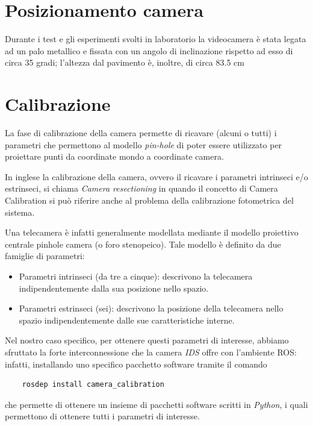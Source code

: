 \section{Posizionamento camera}

Durante i test e gli esperimenti svolti in laboratorio la videocamera è stata legata ad un palo metallico e fissata con un angolo di inclinazione rispetto ad esso di circa 35 gradi; l'altezza dal pavimento è, inoltre, di circa 83.5 cm

\section{Calibrazione}
La fase di calibrazione della camera permette di ricavare (alcuni o tutti) i parametri che permettono al modello \textit{pin-hole} di poter essere utilizzato per proiettare punti da coordinate mondo a coordinate camera. 

In inglese la calibrazione della camera, ovvero il ricavare i parametri intrinseci e/o estrinseci, si chiama \textit{Camera resectioning} in quando il concetto di Camera Calibration si può riferire anche al problema della calibrazione fotometrica del sistema.

Una telecamera è infatti generalmente modellata mediante il modello proiettivo centrale pinhole camera (o foro stenopeico). Tale modello è definito da due famiglie di parametri:

\begin{itemize}
	\item Parametri intrinseci (da tre a cinque): descrivono la telecamera indipendentemente dalla sua posizione nello spazio.
	\item Parametri estrinseci (sei): descrivono la posizione della telecamera nello spazio indipendentemente dalle sue caratteristiche interne.
\end{itemize}

Nel nostro caso specifico, per ottenere questi parametri di interesse, abbiamo sfruttato la forte interconnessione che la camera \textit{IDS} offre con l'ambiente ROS: infatti, installando uno specifico pacchetto software tramite il comando 

\begin{lstlisting}
	rosdep install camera_calibration
\end{lstlisting}

che permette di ottenere un insieme di pacchetti software scritti in \textit{Python}, i quali permettono di ottenere tutti i parametri di interesse.

